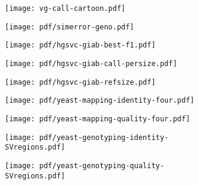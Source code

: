 \documentclass{article}
\begin{document}
\begin{figure}
  \begin{subfigure}[b]{\textwidth}
    \caption{}
    \texttt{[image: vg-call-cartoon.pdf]}
  \end{subfigure}

  \begin{subfigure}[b]{\textwidth}
    \caption{}
    \texttt{[image: pdf/simerror-geno.pdf]}
  \end{subfigure}
\end{figure}

\clearpage
\begin{figure}
  \begin{subfigure}[b]{\textwidth}
    \caption{}
    \texttt{[image: pdf/hgsvc-giab-best-f1.pdf]}
  \end{subfigure}

  \begin{subfigure}[b]{\textwidth}
    \caption{}
    \texttt{[image: pdf/hgsvc-giab-call-persize.pdf]}
  \end{subfigure}

  \begin{subfigure}[b]{\textwidth}
    \caption{}
    \texttt{[image: pdf/hgsvc-giab-refsize.pdf]}
  \end{subfigure}
\end{figure}

\clearpage
\begin{figure}
  \begin{subfigure}[b]{.5\textwidth}
    \caption{}
    \texttt{[image: pdf/yeast-mapping-identity-four.pdf]}
  \end{subfigure}
  \begin{subfigure}[b]{.5\textwidth}
    \caption{}
    \texttt{[image: pdf/yeast-mapping-quality-four.pdf]}
  \end{subfigure}
\end{figure}

\clearpage
\begin{figure}
  \begin{subfigure}[b]{.6\textwidth}
    \caption{}
    \texttt{[image: pdf/yeast-genotyping-identity-SVregions.pdf]}
  \end{subfigure}
  \begin{subfigure}[b]{.4\textwidth}
    \caption{}
    \texttt{[image: pdf/yeast-genotyping-quality-SVregions.pdf]}
  \end{subfigure}
\end{figure}
\end{document}
